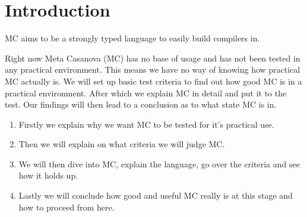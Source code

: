 \section{Introduction}

MC aims to be a strongly typed language to easily build compilers in.

Right now Meta Casanova (MC) has no base of usage and has not been tested in any practical environment.
This means we have no way of knowing how practical MC actually is.
We will set up basic test criteria to find out how good MC is in a practical environment.
After which we explain MC in detail and put it to the test.
Our findings will then lead to a conclusion as to what state MC is in.

\begin{enumerate}
	\item Firstly we explain why we want MC to be tested for it's practical use.
	\item Then we will explain on what criteria we will judge MC.
	\item We will then dive into MC, explain the language, go over the criteria and see how it holds up.
	\item Lastly we will conclude how good and useful MC really is at this stage and how to proceed from here.
\end{enumerate}
